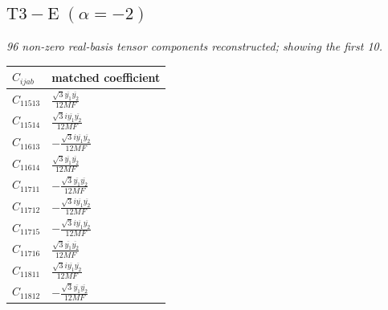 \documentclass[9pt]{article}
\begin{document}
\subsection*{$ \mathrm{T3-E}\;(\alpha=-2) $}
\textit{96 non-zero real-basis tensor components reconstructed; showing the first 10.}
\begin{longtable}{@{}ll@{}}
\toprule
$C_{ijab}$ & matched coefficient \\
\midrule
$C_{11513}$ & $ \frac{\sqrt{3} \overline{y_{1}} \overline{y_{2}}}{12 MF} $ \\
$C_{11514}$ & $ \frac{\sqrt{3} i \overline{y_{1}} \overline{y_{2}}}{12 MF} $ \\
$C_{11613}$ & $ - \frac{\sqrt{3} i \overline{y_{1}} \overline{y_{2}}}{12 MF} $ \\
$C_{11614}$ & $ \frac{\sqrt{3} \overline{y_{1}} \overline{y_{2}}}{12 MF} $ \\
$C_{11711}$ & $ - \frac{\sqrt{3} \overline{y_{1}} \overline{y_{2}}}{12 MF} $ \\
$C_{11712}$ & $ - \frac{\sqrt{3} i \overline{y_{1}} \overline{y_{2}}}{12 MF} $ \\
$C_{11715}$ & $ - \frac{\sqrt{3} i \overline{y_{1}} \overline{y_{2}}}{12 MF} $ \\
$C_{11716}$ & $ \frac{\sqrt{3} \overline{y_{1}} \overline{y_{2}}}{12 MF} $ \\
$C_{11811}$ & $ \frac{\sqrt{3} i \overline{y_{1}} \overline{y_{2}}}{12 MF} $ \\
$C_{11812}$ & $ - \frac{\sqrt{3} \overline{y_{1}} \overline{y_{2}}}{12 MF} $ \\
\bottomrule
\end{longtable}
\end{document}
